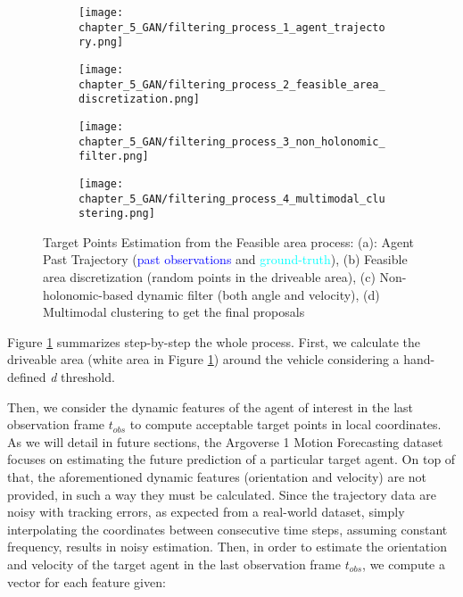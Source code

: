 \begin{figure}[!ht]
	\centering
	\begin{subfigure}{0.24\textwidth}
		\texttt{[image: chapter\_5\_GAN/filtering\_process\_1\_agent\_trajectory.png]}	
		\caption{}
	\end{subfigure}
	\hfill
	\begin{subfigure}{0.24\textwidth}
		\texttt{[image: chapter\_5\_GAN/filtering\_process\_2\_feasible\_area\_discretization.png]}
		\caption{}
	\end{subfigure}
	\hfill
	\begin{subfigure}{0.24\textwidth}
		\texttt{[image: chapter\_5\_GAN/filtering\_process\_3\_non\_holonomic\_filter.png]}
		\caption{}
	\end{subfigure}
	\hfill
	\begin{subfigure}{0.24\textwidth}
		\texttt{[image: chapter\_5\_GAN/filtering\_process\_4\_multimodal\_clustering.png]}
		\caption{}
	\end{subfigure}
	\captionsetup{justification=justified}
	\caption[Target Points Estimation from the Feasible area process]{Target Points Estimation from the Feasible area process: (a): Agent Past Trajectory (\textcolor{blue}{past observations} and \textcolor{aqua}{ground-truth}), (b) Feasible area discretization (random points in the driveable area), (c) Non-holonomic-based dynamic filter (both angle and velocity), (d) Multimodal clustering to get the final proposals}
	\label{fig:chapter_5_GAN/target_points_extraction}
\end{figure}

Figure \ref{fig:chapter_5_GAN/target_points_extraction} summarizes step-by-step the whole process. First, we calculate the driveable area (white area in Figure \ref{fig:chapter_5_GAN/target_points_extraction}) around the vehicle considering a hand-defined \textit{d} threshold.

Then, we consider the dynamic features of the agent of interest in the last observation frame $t_{obs}$ to compute acceptable target points in local coordinates. As we will detail in future sections, the Argoverse 1 Motion Forecasting dataset focuses on estimating the future prediction of a particular target agent. On top of that, the aforementioned dynamic features (orientation and velocity) are not provided, in such a way they must be calculated. Since the trajectory data are noisy with tracking errors, as expected from a real-world dataset, simply interpolating the coordinates between consecutive time steps, assuming constant frequency, results in noisy estimation. Then, in order to estimate the orientation and velocity of the target agent in the last observation frame $t_{obs}$, we compute a vector for each feature given:

